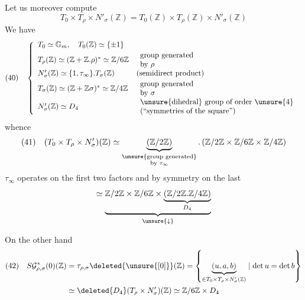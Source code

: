 Let us moreover compute
\[
T_0\times T_\rho\times N'_\sigma(\mathbb Z)
=T_0(\mathbb Z)\times T_\rho(\mathbb Z)\times N'_\sigma(\mathbb Z)
\]
We have
\[
(40)\quad
\left\{
\begin{array}{ll}
T_0\simeq\mathbb G_m,\quad T_0(\mathbb Z)\simeq\{\pm1\}&\\[2pt]
T_\rho(\mathbb Z)\simeq(\mathbb Z+\mathbb Z.\rho)^*\simeq\mathbb Z/6\mathbb Z
&\begin{array}{l}\text{group generated}\\\text{by }\rho\end{array}\\[2pt]
N'_\sigma(\mathbb Z)\simeq\{1,\tau_\infty\}.T_\sigma(\mathbb Z)
&\text{(semidirect product)}\\[2pt]
T_\sigma(\mathbb Z)\simeq(\mathbb Z+\mathbb Z\sigma)^*\simeq\mathbb Z/4\mathbb Z
&\begin{array}{l}\text{group generated}\\\text{by }\sigma\end{array}\\[2pt]
N'_\sigma(\mathbb Z)\simeq D_4
&\begin{array}{l}\text{\unsure{dihedral} group of order \unsure{4}}\\\text{(``symmetries of the square'')}\end{array}
\end{array}
\right.
\]
whence
\[
(41)\quad (T_0\times T_\rho\times N'_\sigma)(\mathbb Z)
\simeq
\underbrace{(\mathbb Z/2\mathbb Z)}_{\substack{\text{\unsure{group generated}}\\\text{by }\tau_\infty}}
.\,(\mathbb Z/2\mathbb Z\times\mathbb Z/6\mathbb Z\times\mathbb Z/4\mathbb Z)
\]
\hfill $\tau_\infty$ operates  on the first two factors and by symmetry on the last
\[
\simeq\underbrace{\mathbb Z/2\mathbb Z\times\mathbb Z/6\mathbb Z\times
\underbrace{(\mathbb Z/2\mathbb Z.\mathbb Z/4\mathbb Z)}_{D_4}}_{\unsure{\downarrow}}
\]

On the other hand
\[
\begin{aligned}
(42)\quad S\mathcal G^*_{\rho,\sigma}(0)(\mathbb Z)
&=\tau_{\rho,\sigma}\deleted{\unsure{[0]}}(\mathbb Z)
=\left\{\underbrace{(u,a,b)}_{\in T_0\times T_\rho\times N'_\sigma(\mathbb Z)}\mid\det u=\det b\right\}\\
&\simeq\deleted{D_4}(T_\rho\times N'_\sigma)(\mathbb Z)\simeq\mathbb Z/6\mathbb Z\times D_4
\end{aligned}
\]
\deleted{$\tau_\infty,$}

